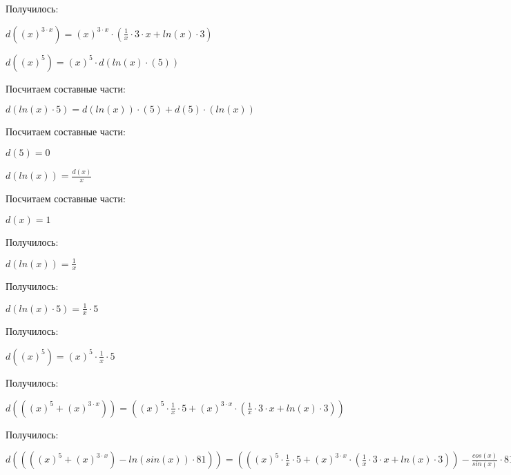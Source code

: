 Получилось:

$ d((x)^{3 \cdot x}) = (x)^{3 \cdot x} \cdot (\frac{1}{x} \cdot 3 \cdot x+ln(x) \cdot 3)$

$ d((x)^{5}) = (x)^{5} \cdot d(ln(x) \cdot (5))$

Посчитаем составные части:

$ d(ln(x) \cdot 5) = d(ln(x)) \cdot (5) + d(5) \cdot (ln(x))$

Посчитаем составные части:

$ d(5) = 0$

$ d(ln(x)) = \frac{d(x)}{x}$

Посчитаем составные части:

$ d(x) = 1$

Получилось:

$ d(ln(x)) = \frac{1}{x}$

Получилось:

$ d(ln(x) \cdot 5) = \frac{1}{x} \cdot 5$

Получилось:

$ d((x)^{5}) = (x)^{5} \cdot \frac{1}{x} \cdot 5$

Получилось:

$ d(((x)^{5}+(x)^{3 \cdot x})) = ((x)^{5} \cdot \frac{1}{x} \cdot 5+(x)^{3 \cdot x} \cdot (\frac{1}{x} \cdot 3 \cdot x+ln(x) \cdot 3))$

Получилось:

$ d((((x)^{5}+(x)^{3 \cdot x})-ln(sin(x)) \cdot 81)) = (((x)^{5} \cdot \frac{1}{x} \cdot 5+(x)^{3 \cdot x} \cdot (\frac{1}{x} \cdot 3 \cdot x+ln(x) \cdot 3))-\frac{cos(x)}{sin(x)} \cdot 81)$

